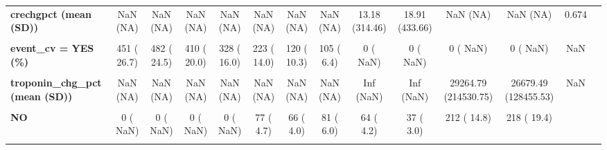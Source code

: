 \documentclass[
]{article}
\begin{document}
\begin{table}[H]
\begin{tabular}[t]{>{\raggedright\arraybackslash}p{5em}ccccccccccccc}
\textbf{crechgpct (mean (SD))} & NaN (NA) & NaN (NA) & NaN (NA) & NaN (NA) & NaN (NA) & NaN (NA) & NaN (NA) & 13.18 (314.46) & 18.91 (433.66) & NaN (NA) & NaN (NA) & 0.674 & \\
\textbf{\cellcolor{gray!10}{days2ccu (mean (SD))}} & \cellcolor{gray!10}{NaN (NA)} & \cellcolor{gray!10}{NaN (NA)} & \cellcolor{gray!10}{NaN (NA)} & \cellcolor{gray!10}{NaN (NA)} & \cellcolor{gray!10}{0.72 (1.26)} & \cellcolor{gray!10}{2.29 (2.13)} & \cellcolor{gray!10}{2.00 (2.56)} & \cellcolor{gray!10}{1.94 (2.42)} & \cellcolor{gray!10}{1.63 (1.78)} & \cellcolor{gray!10}{1.41 (2.44)} & \cellcolor{gray!10}{1.93 (1.94)} & \cellcolor{gray!10}{<0.001} & \cellcolor{gray!10}{}\\
\textbf{event\_cv = YES (\%)} & 451 ( 26.7) & 482 ( 24.5) & 410 ( 20.0) & 328 ( 16.0) & 223 ( 14.0) & 120 ( 10.3) & 105 (  6.4) & 0 (  NaN) & 0 (  NaN) & 0 (  NaN) & 0 (  NaN) & NaN & \\
\textbf{\cellcolor{gray!10}{hours2ccu (mean (SD))}} & \cellcolor{gray!10}{NaN (NA)} & \cellcolor{gray!10}{NaN (NA)} & \cellcolor{gray!10}{NaN (NA)} & \cellcolor{gray!10}{NaN (NA)} & \cellcolor{gray!10}{22.24 (59.56)} & \cellcolor{gray!10}{52.16 (48.17)} & \cellcolor{gray!10}{46.96 (58.89)} & \cellcolor{gray!10}{50.66 (61.40)} & \cellcolor{gray!10}{38.22 (40.78)} & \cellcolor{gray!10}{44.96 (58.51)} & \cellcolor{gray!10}{46.28 (46.53)} & \cellcolor{gray!10}{<0.001} & \cellcolor{gray!10}{}\\
\textbf{troponin\_chg\_pct (mean (SD))} & NaN (NA) & NaN (NA) & NaN (NA) & NaN (NA) & NaN (NA) & NaN (NA) & NaN (NA) & Inf (NaN) & Inf (NaN) & 29264.79 (214530.75) & 26679.49 (128455.53) & NaN & \\
\textbf{\cellcolor{gray!10}{FASP (\%)}} & \cellcolor{gray!10}{} & \cellcolor{gray!10}{} & \cellcolor{gray!10}{} & \cellcolor{gray!10}{} & \cellcolor{gray!10}{} & \cellcolor{gray!10}{} & \cellcolor{gray!10}{} & \cellcolor{gray!10}{} & \cellcolor{gray!10}{} & \cellcolor{gray!10}{} & \cellcolor{gray!10}{} & \cellcolor{gray!10}{NaN} & \cellcolor{gray!10}{}\\
\textbf{NO} & 0 (  NaN) & 0 (  NaN) & 0 (  NaN) & 0 (  NaN) & 77 (  4.7) & 66 (  4.0) & 81 (  6.0) & 64 (  4.2) & 37 (  3.0) & 212 ( 14.8) & 218 ( 19.4) &  & \\
\textbf{\cellcolor{gray!10}{Unknown}} & \cellcolor{gray!10}{0 (  NaN)} & \cellcolor{gray!10}{0 (  NaN)} & \cellcolor{gray!10}{0 (  NaN)} & \cellcolor{gray!10}{0 (  NaN)} & \cellcolor{gray!10}{0 (  0.0)} & \cellcolor{gray!10}{0 (  0.0)} & \cellcolor{gray!10}{0 (  0.0)} & \cellcolor{gray!10}{0 (  0.0)} & \cellcolor{gray!10}{0 (  0.0)} & \cellcolor{gray!10}{0 (  0.0)} & \cellcolor{gray!10}{42 (  3.7)} & \cellcolor{gray!10}{ \vphantom{3}} & \cellcolor{gray!10}{}\\

\end{tabular}
\end{table}
\end{document}
